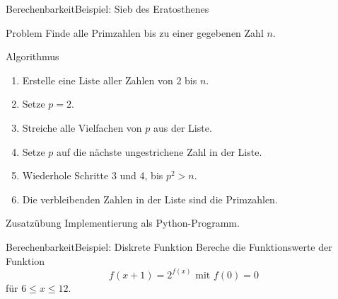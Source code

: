 \documentclass[xelatex,aspectratio=169]{beamer}
\begin{document}
\begin{frame}{Berechenbarkeit}{Beispiel: Sieb des Eratosthenes}
  \begin{block}{Problem}
    Finde alle Primzahlen bis zu einer gegebenen Zahl $n$.
  \end{block}

  \begin{block}{Algorithmus}
    \begin{enumerate}
      \item Erstelle eine Liste aller Zahlen von 2 bis $n$.
      \item Setze $p = 2$.
      \item Streiche alle Vielfachen von $p$ aus der Liste.
      \item Setze $p$ auf die nächste ungestrichene Zahl in der Liste.
      \item Wiederhole Schritte 3 und 4, bis $p^2 > n$.
      \item Die verbleibenden Zahlen in der Liste sind die Primzahlen.
    \end{enumerate}
  \end{block}

  \begin{exampleblock}{Zusatzübung}
    Implementierung als Python-Programm.
  \end{exampleblock}
\end{frame}

\begin{frame}{Berechenbarkeit}{Beispiel: Diskrete Funktion}
  Bereche die Funktionswerte der Funktion
  \[
    f\left(x+1\right) = 2 ^ {f\left(x\right)} \mbox{ mit } f\left(0\right) = 0
  \]
  für \( 6 \leq x \leq 12 \).



\end{frame}
\end{document}
